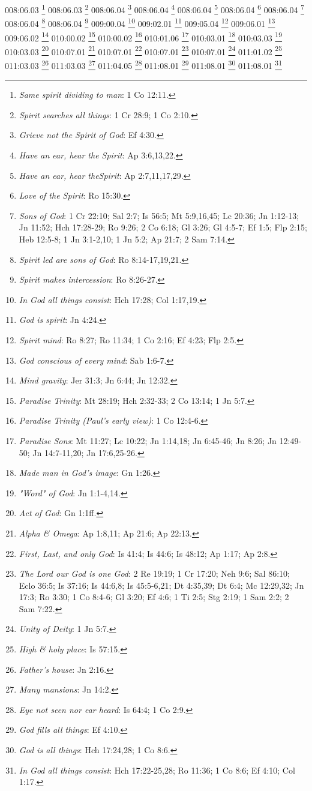 {008:06.03 \footnote{\textit{Same spirit dividing to man}: 1 Co 12:11.}
008:06.03 \footnote{\textit{Spirit searches all things}: 1 Cr 28:9; 1 Co 2:10.}
008:06.04 \footnote{\textit{Grieve not the Spirit of God}: Ef 4:30.}
008:06.04 \footnote{\textit{Have an ear, hear the Spirit}: Ap 3:6,13,22.}
008:06.04 \footnote{\textit{Have an ear, hear theSpirit}: Ap 2:7,11,17,29.}
008:06.04 \footnote{\textit{Love of the Spirit}: Ro 15:30.}
008:06.04 \footnote{\textit{Sons of God}: 1 Cr 22:10; Sal 2:7; Is 56:5; Mt 5:9,16,45; Lc 20:36; Jn 1:12-13; Jn 11:52; Hch 17:28-29; Ro 9:26; 2 Co 6:18; Gl 3:26; Gl 4:5-7; Ef 1:5; Flp 2:15; Heb 12:5-8; 1 Jn 3:1-2,10; 1 Jn 5:2; Ap 21:7; 2 Sam 7:14.}
008:06.04 \footnote{\textit{Spirit led are sons of God}: Ro 8:14-17,19,21.}
008:06.04 \footnote{\textit{Spirit makes intercession}: Ro 8:26-27.}
009:00.04 \footnote{\textit{In God all things consist}: Hch 17:28; Col 1:17,19.}
009:02.01 \footnote{\textit{God is spirit}: Jn 4:24.}
009:05.04 \footnote{\textit{Spirit mind}: Ro 8:27; Ro 11:34; 1 Co 2:16; Ef 4:23; Flp 2:5.}
009:06.01 \footnote{\textit{God conscious of every mind}: Sab 1:6-7.}
009:06.02 \footnote{\textit{Mind gravity}: Jer 31:3; Jn 6:44; Jn 12:32.}
010:00.02 \footnote{\textit{Paradise Trinity}: Mt 28:19; Hch 2:32-33; 2 Co 13:14; 1 Jn 5:7.}
010:00.02 \footnote{\textit{Paradise Trinity (Paul's early view)}: 1 Co 12:4-6.}
010:01.06 \footnote{\textit{Paradise Sons}: Mt 11:27; Lc 10:22; Jn 1:14,18; Jn 6:45-46; Jn 8:26; Jn 12:49-50; Jn 14:7-11,20; Jn 17:6,25-26.}
010:03.01 \footnote{\textit{Made man in God's image}: Gn 1:26.}
010:03.03 \footnote{\textit{"Word" of God}: Jn 1:1-4,14.}
010:03.03 \footnote{\textit{Act of God}: Gn 1:1ff.}
010:07.01 \footnote{\textit{Alpha & Omega}: Ap 1:8,11; Ap 21:6; Ap 22:13.}
010:07.01 \footnote{\textit{First, Last, and only God}: Is 41:4; Is 44:6; Is 48:12; Ap 1:17; Ap 2:8.}
010:07.01 \footnote{\textit{The Lord our God is one God}: 2 Re 19:19; 1 Cr 17:20; Neh 9:6; Sal 86:10; Eclo 36:5; Is 37:16; Is 44:6,8; Is 45:5-6,21; Dt 4:35,39; Dt 6:4; Mc 12:29,32; Jn 17:3; Ro 3:30; 1 Co 8:4-6; Gl 3:20; Ef 4:6; 1 Ti 2:5; Stg 2:19; 1 Sam 2:2; 2 Sam 7:22.}
010:07.01 \footnote{\textit{Unity of Deity}: 1 Jn 5:7.}
011:01.02 \footnote{\textit{High & holy place}: Is 57:15.}
011:03.03 \footnote{\textit{Father's house}: Jn 2:16.}
011:03.03 \footnote{\textit{Many mansions}: Jn 14:2.}
011:04.05 \footnote{\textit{Eye not seen nor ear heard}: Is 64:4; 1 Co 2:9.}
011:08.01 \footnote{\textit{God fills all things}: Ef 4:10.}
011:08.01 \footnote{\textit{God is all things}: Hch 17:24,28; 1 Co 8:6.}
011:08.01 \footnote{\textit{In God all things consist}: Hch 17:22-25,28; Ro 11:36; 1 Co 8:6; Ef 4:10; Col 1:17.}
}

